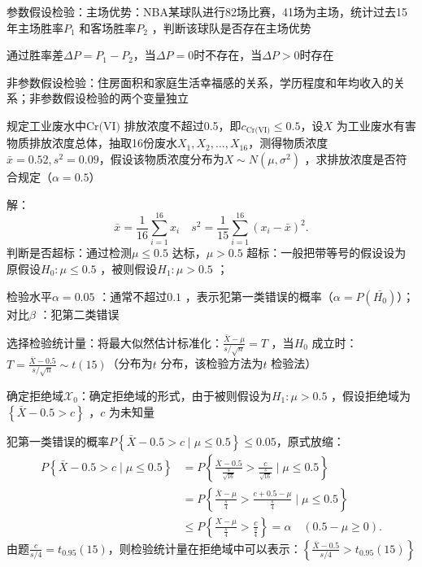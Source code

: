 \begin{eg}
    参数假设检验：主场优势：NBA某球队进行82场比赛，41场为主场，统计过去15年主场胜率$P_1$ 和客场胜率$P_2$ ，判断该球队是否存在主场优势
\end{eg}
通过胜率差$\Delta P=P_1-P_2$，当$\Delta P=0$时不存在，当$\Delta P>0$时存在
\begin{notation}
    非参数假设检验：住房面积和家庭生活幸福感的关系，学历程度和年均收入的关系；非参数假设检验的两个变量独立
\end{notation}
\begin{eg}
    规定工业废水中$\text{Cr(VI)}$ 排放浓度不超过0.5，即$c_\text{Cr(VI)}\le 0.5$，设$X$ 为工业废水有害物质排放浓度总体，抽取16份废水$X_1,X_2,\ldots ,X_{16}$，测得物质浓度$\bar{x}=0.52,s^2 =0.09$，假设该物质浓度分布为$X\sim N\left( \mu,\sigma^2  \right)$ ，求排放浓度是否符合规定（$\alpha=0.5$）
\end{eg}
解：\[
    \bar{x}=\frac{1}{16}\sum_{i=1}^{16} x_{i}\quad s^2 =\frac{1}{15}\sum_{i=1}^{16} \left( x_{i}-\bar{x} \right)^2 
.\]
判断是否超标：通过检测$\mu\le 0.5$ 达标，$\mu>0.5$ 超标：一般把带等号的假设设为原假设$H_0:\mu\le 0.5$ ，被则假设$H_1:\mu>0.5$ ；

检验水平$\alpha=0.05$ ：通常不超过$0.1$ ，表示犯第一类错误的概率（$\alpha=P\left( \bar{H_0} \right)$）；对比$\beta$ ：犯第二类错误

选择检验统计量：将最大似然估计标准化：$\frac{\bar{X}-\mu}{s /\sqrt{n}}=T$ ，当$H_0$ 成立时：$T=\frac{\bar{X}-0.5}{s /\sqrt{n}}\sim t\left( 15 \right)$（分布为$t$ 分布，该检验方法为$t$ 检验法）

确定拒绝域$\mathscr{X}_0$：确定拒绝域的形式，由于被则假设为$H_1:\mu>0.5$ ，假设拒绝域为$\left\{ \bar{X}-0.5>c \right\}$ ，$c$ 为未知量

犯第一类错误的概率$P\left\{ \bar{X}-0.5>c \mid \mu\le 0.5 \right\}\le 0.05$，原式放缩：
\begin{align*}
    P\left\{ \bar{X}-0.5>c \mid \mu\le 0.5 \right\}&= P\left\{ \frac{\bar{X}-0.5}{\frac{s}{\sqrt{16}}}>\frac{c}{\frac{s}{\sqrt{16}}} \mid \mu\le 0.5\right\} \\
    &= P\left\{ \frac{\bar{X}-\mu}{\frac{s}{4}}>\frac{c+0.5-\mu}{\frac{s}{4}}\mid \mu\le 0.5 \right\} \\
    &\le P\left\{ \frac{X-\mu}{\frac{s}{4}}>\frac{c}{\frac{s}{4}} \right\}=\alpha \quad \left( 0.5-\mu\ge 0 \right)
.\end{align*}
由题$\frac{c}{s /4}=t_{0.95}\left( 15 \right)$，则检验统计量在拒绝域中可以表示：$\left\{ \frac{\bar{X}-0.5}{s /4}>t_{0.95}\left( 15 \right) \right\}$ 

